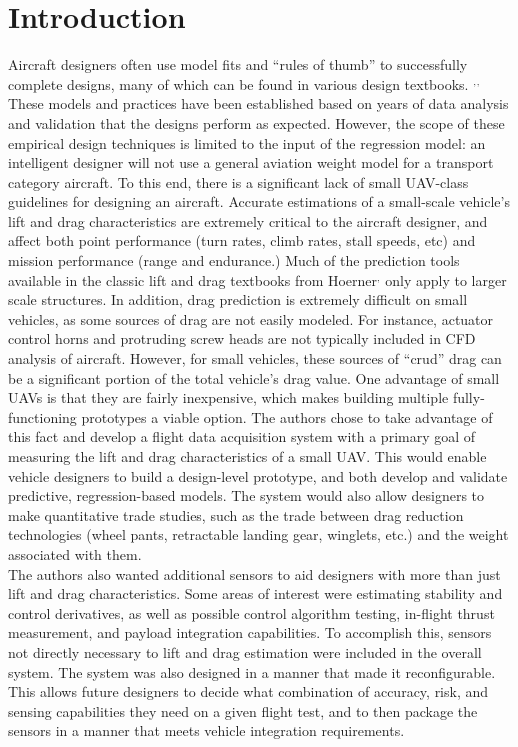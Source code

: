 \section{Introduction}
\label{intro}
Aircraft designers often use model fits and ``rules of thumb'' to successfully complete designs, many of which can be found in various design textbooks. \cite{raymer}$^,$\cite{nicolai2010fundamentals}$^,$\cite{roskam1985airplane} These models and practices have been established based on years of data analysis and validation that the designs perform as expected. However, the scope of these empirical design techniques is limited to the input of the regression model: an intelligent designer will not use a general aviation weight model for a transport category aircraft. To this end, there is a significant lack of small UAV-class guidelines for designing an aircraft. Accurate estimations of a small-scale vehicle's lift and drag characteristics are extremely critical to the aircraft designer, and affect both point performance (turn rates, climb rates, stall speeds, etc) and mission performance (range and endurance.) Much of the prediction tools available in the classic lift and drag textbooks from Hoerner\cite{hoernerDrag}$^,$\cite{hoernerLift} only apply to larger scale structures. In addition, drag prediction is extremely difficult on small vehicles, as some sources of drag are not easily modeled. For instance, actuator control horns and protruding screw heads are not typically included in CFD  analysis of aircraft. However, for small vehicles, these sources of ``crud'' drag can be a significant portion of the total vehicle's drag value. One advantage of small UAVs is that they are fairly inexpensive, which makes building multiple fully-functioning prototypes a viable option. The authors chose to take advantage of this fact and develop a flight data acquisition system with a primary goal of measuring the lift and drag characteristics of a small UAV. This would enable vehicle designers to build a design-level prototype, and both develop and validate predictive, regression-based models. The system would also allow designers to make quantitative trade studies, such as the trade between drag reduction technologies (wheel pants, retractable landing gear, winglets, etc.) and the weight associated with them.\\

The authors also wanted additional sensors to aid designers with more than just lift and drag characteristics. Some areas of interest were estimating stability and control derivatives, as well as possible control algorithm testing, in-flight thrust measurement, and payload integration capabilities. To accomplish this, sensors not directly necessary to lift and drag estimation were included in the overall system. The system was also designed in a manner that made it reconfigurable. This allows future designers to decide what combination of accuracy, risk, and sensing capabilities they need on a given flight test, and to then package the sensors in a manner that meets vehicle integration requirements.\\

